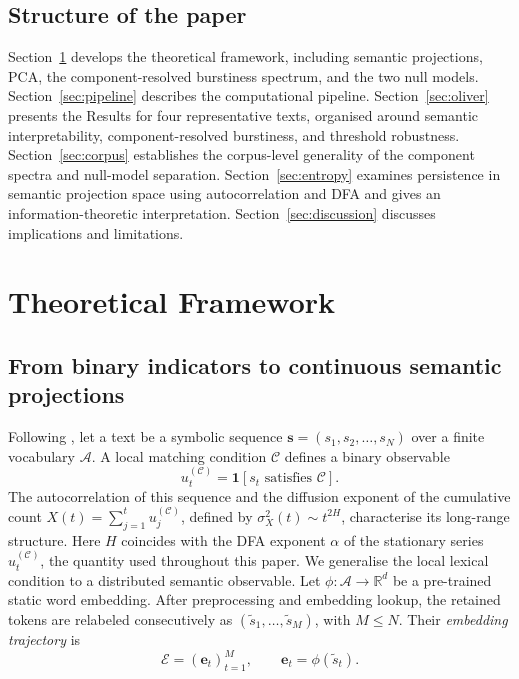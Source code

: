 \documentclass[preprint]{elsarticle}
\newcommand{\et}{\mathbf{e}_t}
\newcommand{\R}{\mathbb{R}}
\begin{document}
\subsection{Structure of the paper}

Section~\ref{sec:theory} develops the theoretical framework, including
semantic projections, PCA, the component-resolved burstiness spectrum,
and the two null models. Section~\ref{sec:pipeline} describes the
computational pipeline. Section~\ref{sec:oliver} presents the Results
for four representative texts, organised around semantic
interpretability, component-resolved burstiness, and threshold
robustness. Section~\ref{sec:corpus} establishes the corpus-level
generality of the component spectra and null-model separation.
Section~\ref{sec:entropy} examines persistence in semantic projection
space using autocorrelation and DFA and gives an information-theoretic
interpretation. Section~\ref{sec:discussion} discusses implications
and limitations.

\section{Theoretical Framework}
\label{sec:theory}

\subsection{From binary indicators to continuous semantic projections}
\label{sec:observables}

Following \citet{Altmann2012}, let a text be a symbolic sequence
$\mathbf{s}=(s_1,s_2,\ldots,s_N)$ over a finite vocabulary
$\mathcal{A}$.
A local matching condition $\mathcal{C}$ defines a binary observable
\begin{equation}
  u_t^{(\mathcal{C})}=\mathbf{1}[s_t\text{ satisfies }\mathcal{C}].
  \label{eq:binary_indicator}
\end{equation}
The autocorrelation of this sequence and the diffusion exponent of the
cumulative count $X(t)=\sum_{j=1}^t u_j^{(\mathcal{C})}$, defined by
$\sigma_X^2(t)\sim t^{2H}$, characterise its long-range structure.
Here $H$ coincides with the DFA exponent $\alpha$ of the stationary
series $u_t^{(\mathcal{C})}$, the quantity used throughout this paper.
We generalise the local lexical condition to a distributed semantic
observable.
Let $\phi:\mathcal{A}\to\R^d$ be a pre-trained static word embedding.
After preprocessing and embedding lookup, the retained tokens are
relabeled consecutively as $(\tilde s_1,\ldots,\tilde s_M)$, with
$M\leq N$.
Their \emph{embedding trajectory} is
\begin{equation}
  \mathcal{E}=(\et)_{t=1}^M,
  \qquad
  \et=\phi(\tilde s_t).
  \label{eq:trajectory}
\end{equation}
\end{document}

